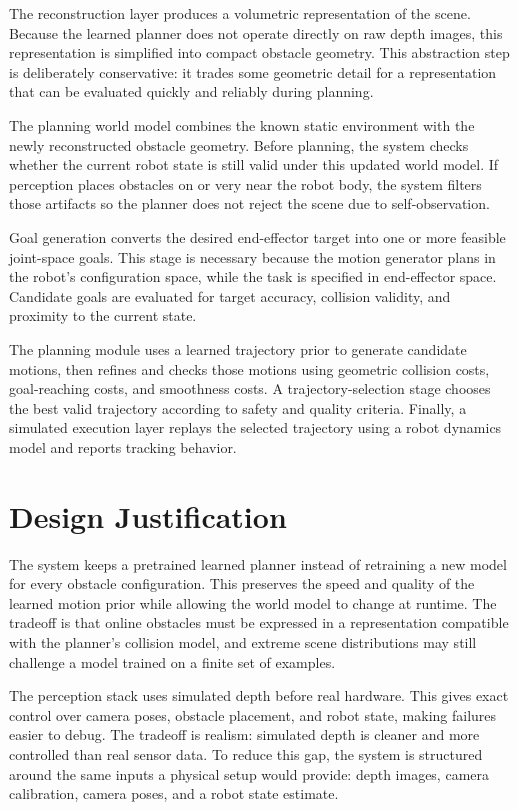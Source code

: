 \documentclass[11pt]{article}
\begin{document}
The reconstruction layer produces a volumetric representation of the scene. Because the learned planner does not operate directly on raw depth images, this representation is simplified into compact obstacle geometry. This abstraction step is deliberately conservative: it trades some geometric detail for a representation that can be evaluated quickly and reliably during planning.

The planning world model combines the known static environment with the newly reconstructed obstacle geometry. Before planning, the system checks whether the current robot state is still valid under this updated world model. If perception places obstacles on or very near the robot body, the system filters those artifacts so the planner does not reject the scene due to self-observation.

Goal generation converts the desired end-effector target into one or more feasible joint-space goals. This stage is necessary because the motion generator plans in the robot's configuration space, while the task is specified in end-effector space. Candidate goals are evaluated for target accuracy, collision validity, and proximity to the current state.

The planning module uses a learned trajectory prior to generate candidate motions, then refines and checks those motions using geometric collision costs, goal-reaching costs, and smoothness costs. A trajectory-selection stage chooses the best valid trajectory according to safety and quality criteria. Finally, a simulated execution layer replays the selected trajectory using a robot dynamics model and reports tracking behavior.

\section{Design Justification}

The system keeps a pretrained learned planner instead of retraining a new model for every obstacle configuration. This preserves the speed and quality of the learned motion prior while allowing the world model to change at runtime. The tradeoff is that online obstacles must be expressed in a representation compatible with the planner's collision model, and extreme scene distributions may still challenge a model trained on a finite set of examples.

The perception stack uses simulated depth before real hardware. This gives exact control over camera poses, obstacle placement, and robot state, making failures easier to debug. The tradeoff is realism: simulated depth is cleaner and more controlled than real sensor data. To reduce this gap, the system is structured around the same inputs a physical setup would provide: depth images, camera calibration, camera poses, and a robot state estimate.
\end{document}
